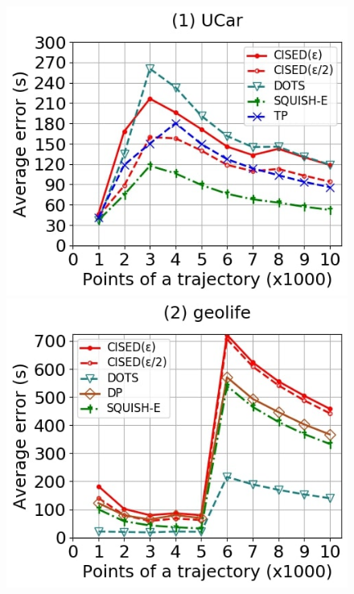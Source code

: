 {\begin{figure}[tb!]
	\centering
	\includegraphics[scale=0.250]{Figures/Exp-when-SED-error-size-service.jpg} 	\hspace{0.5ex}
	\includegraphics[scale=0.250]{Figures/Exp-when-SED-error-size-geolife.jpg}	\hspace{0.5ex}

\end{figure}}
